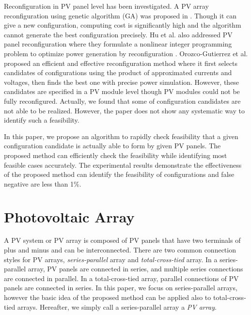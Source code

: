 \documentclass[conference]{pvsctran}
\begin{document}
Reconfiguration in PV panel level has been investigated\cite{carotenuto2015evolutionary,hu2017non,orozco2016optimized}. 
A PV array reconfiguration using genetic algorithm (GA) was proposed in \cite{carotenuto2015evolutionary}. Though it can give a new configuration, computing cost is significantly high and the algorithm cannot generate the best configuration precisely.  
Hu et al. also addressed PV panel reconfiguration where they formulate a nonlinear integer programming problem to optimize power generation by reconfiguration \cite{hu2017non}.
Orozco-Gutierrez et al. proposed an efficient and effective reconfiguration method\cite{orozco2016optimized} where it first selects candidates of configurations using the product of approximated currents and voltages,
then finds the best one with precise power simulation. 
However, these candidates are specified in a PV module level though PV modules could not be fully reconfigured. Actually, we found that some of configuration candidates are not able to be realized. However, the paper\cite{orozco2016optimized}  does not show any systematic way to identify such a feasibility. 

In this paper, we propose an algorithm to rapidly check feasibility that a given configuration candidate is actually able to form by given PV panels. 
The proposed method can efficiently check the feasibility while identifying most feasible cases accurately. 
The experimental results demonstrate the effectiveness of the proposed method can identify the feasibility of configurations and false negative are less than 1\%.


\section{Photovoltaic Array}\label{Sec2}

A PV system or PV array is composed of PV panels that have two terminals of plus and minus and can be interconnected.
There are two common connection styles for PV arrays, \textit{series-parallel} array and \textit{total-cross-tied} array. 
In a series-parallel array, PV panels are connected in series, and multiple series connections are connected in parallel. 
In a total-cross-tied array, parallel connections of PV panels are connected in series. 
In this paper, we focus on series-parallel arrays, however the basic idea of the proposed method can be applied also to total-cross-tied arrays. 
Hereafter, we simply call a series-parallel array a \textit{PV array}. 
\end{document}
